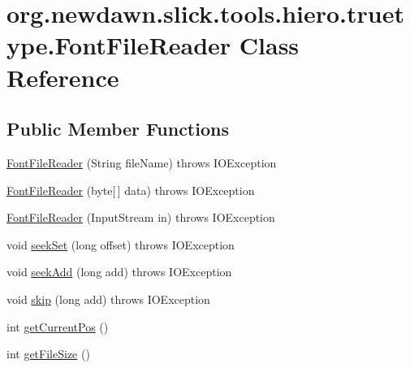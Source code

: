 \hypertarget{classorg_1_1newdawn_1_1slick_1_1tools_1_1hiero_1_1truetype_1_1_font_file_reader}{}\section{org.\+newdawn.\+slick.\+tools.\+hiero.\+truetype.\+Font\+File\+Reader Class Reference}
\label{classorg_1_1newdawn_1_1slick_1_1tools_1_1hiero_1_1truetype_1_1_font_file_reader}
\subsection*{Public Member Functions}
\begin{DoxyCompactItemize}
\item 
\mbox{\hyperlink{classorg_1_1newdawn_1_1slick_1_1tools_1_1hiero_1_1truetype_1_1_font_file_reader_a2b4b6e5f92828e9c88b8dd53c3566b80}{Font\+File\+Reader}} (String file\+Name)  throws I\+O\+Exception 
\item 
\mbox{\hyperlink{classorg_1_1newdawn_1_1slick_1_1tools_1_1hiero_1_1truetype_1_1_font_file_reader_a6ff9dd245ac6799f5e1724569e8cf81c}{Font\+File\+Reader}} (byte\mbox{[}$\,$\mbox{]} data)  throws I\+O\+Exception 
\item 
\mbox{\hyperlink{classorg_1_1newdawn_1_1slick_1_1tools_1_1hiero_1_1truetype_1_1_font_file_reader_ab5d4e15afe03d1a90be3282bd62efd67}{Font\+File\+Reader}} (Input\+Stream in)  throws I\+O\+Exception 
\item 
void \mbox{\hyperlink{classorg_1_1newdawn_1_1slick_1_1tools_1_1hiero_1_1truetype_1_1_font_file_reader_a9697638485df75a15d10c8b41847241d}{seek\+Set}} (long offset)  throws I\+O\+Exception 
\item 
void \mbox{\hyperlink{classorg_1_1newdawn_1_1slick_1_1tools_1_1hiero_1_1truetype_1_1_font_file_reader_a37dae90ed06904b56b3e941998520174}{seek\+Add}} (long add)  throws I\+O\+Exception 
\item 
void \mbox{\hyperlink{classorg_1_1newdawn_1_1slick_1_1tools_1_1hiero_1_1truetype_1_1_font_file_reader_a659cc8eebfd55a1b1816481cca64688b}{skip}} (long add)  throws I\+O\+Exception 
\item 
int \mbox{\hyperlink{classorg_1_1newdawn_1_1slick_1_1tools_1_1hiero_1_1truetype_1_1_font_file_reader_a6eea216bcec24a77aa60baee42672ef9}{get\+Current\+Pos}} ()
\item 
int \mbox{\hyperlink{classorg_1_1newdawn_1_1slick_1_1tools_1_1hiero_1_1truetype_1_1_font_file_reader_a387fc6f82aff517ff093cb46da03f647}{get\+File\+Size}} ()

\end{DoxyCompactItemize}
